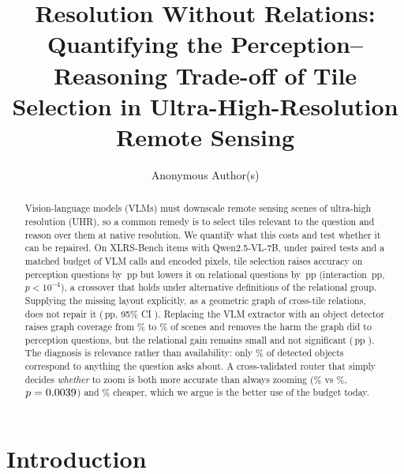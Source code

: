 \documentclass[runningheads]{llncs}
\newcommand{\pp}{\,pp}
\begin{document}
\title{Resolution Without Relations: Quantifying the Perception--Reasoning Trade-off of Tile Selection in Ultra-High-Resolution Remote Sensing}

\author{Anonymous Author(s)}

\maketitle

\begin{abstract}
Vision-language models (VLMs) must downscale remote sensing scenes of ultra-high resolution (UHR), so a common remedy is to select tiles relevant to the question and reason over them at native resolution. We quantify what this costs and test whether it can be repaired. On \nLoaded{} XLRS-Bench items with Qwen2.5-VL-7B, under paired tests and a matched budget of VLM calls and encoded pixels, tile selection raises accuracy on perception questions by \dOTNon\pp{} but lowers it on relational questions by \dOTRel\pp{} (interaction \didVal\pp, $p<10^{-4}$), a crossover that holds under \nPartitions{} alternative definitions of the relational group. Supplying the missing layout explicitly, as a geometric graph of cross-tile relations, does not repair it (\dBPRel\pp, 95\% CI \dciBPRel). Replacing the VLM extractor with an object detector raises graph coverage from \gVcross\% to \gDcross\% of scenes and removes the harm the graph did to perception questions, but the relational gain remains small and not significant (\relDRel\pp{} \relDRelci). The diagnosis is relevance rather than availability: only \detKwShare\% of detected objects correspond to anything the question asks about. A cross-validated router that simply decides \emph{whether} to zoom is both more accurate than always zooming (\routerAcc\% vs \accBThreeAll\%, $p=0.0039$) and \routerSaving\% cheaper, which we argue is the better use of the budget today.
\end{abstract}

\section{Introduction}
\end{document}
